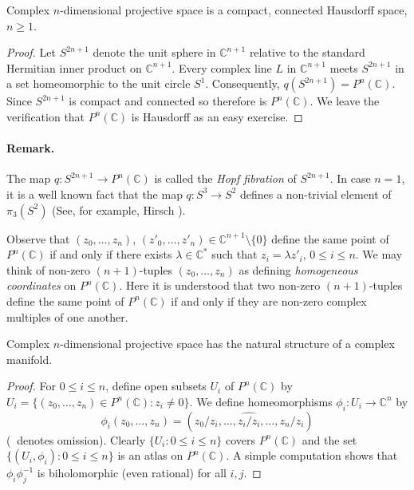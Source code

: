  Complex $n$-dimensional projective space is a compact, connected Hausdorff space, $n\geq1$.
\begin{proof}
Let $S^{2n+1}$ denote the unit sphere in $\mathbb C^{n+1}$ relative to the standard Hermitian inner product on $\mathbb C^{n+1}$. Every complex line $L$ in $\mathbb C^{n+1}$ meets $S^{2n+1}$ in a set homeomorphic to the unit circle $S^1$. Consequently, $q(S^{2n+1})=P^n(\mathbb C)$. Since $S^{2n+1}$ is compact and connected so therefore is $P^n(\mathbb C)$. We leave the verification that $P^n(\mathbb C)$ is Hausdorff as an easy exercise.
\end{proof}
\paragraph*{Remark.} The map $q:S^{2n+1}\longrightarrow P^n(\mathbb C)$ is called the \emph{Hopf fibration} of $S^{2n+1}$. In case $n=1$, it is a well known fact that the map $q:S^3\longrightarrow S^2$ defines a non-trivial element of $\pi_3(S^2)$ (See, for example, Hirsch \cite[page 131]{bib:I:hirsch-m-w:1}).

Observe that $(z_0,\ldots,z_n)$, $(z'_0,\ldots,z'_n)\in\mathbb C^{n+1}\setminus\{0\}$ define the same point of $P^n(\mathbb C)$ if and only if there exists $\lambda\in\mathbb C^*$ such that $z_i=\lambda z'_i$, $0\leq i\leq n$. We may think of non-zero $(n+1)$-tuples $(z_0,\ldots,z_n)$ as defining \emph{homogeneous coordinates} on $P^n(\mathbb C)$. Here it is understood that two non-zero $(n+1)$-tuples define the same point of $P^n(\mathbb C)$ if and only if they are non-zero complex multiples of one another.

 Complex $n$-dimensional projective space has the natural structure of a complex manifold.
\begin{proof}
For $0\leq i\leq n$, define open subsets $U_i$ of $P^n(\mathbb C)$ by $U_i=\{(z_0,\ldots,z_n)\in P^n(\mathbb C):z_i\neq0\}$. We define homeomorphisms $\phi_i:U_i\longrightarrow\mathbb C^n$ by
\[
\phi_i(z_0,\ldots,z_n)=(z_0/z_i,\ldots,\widehat{z_i/z_i},\ldots,z_n/z_i)
\]
($\widehat{\ }$ denotes omission). Clearly $\{U_i:0\leq i\leq n\}$ covers $P^n(\mathbb C)$ and the set $\{(U_i,\phi_i):0\leq i\leq n\}$ is an atlas on $P^n(\mathbb C)$. A simple computation shows that $\phi_i\phi_j^{-1}$ is biholomorphic (even rational) for all $i,j$.
\end{proof}

